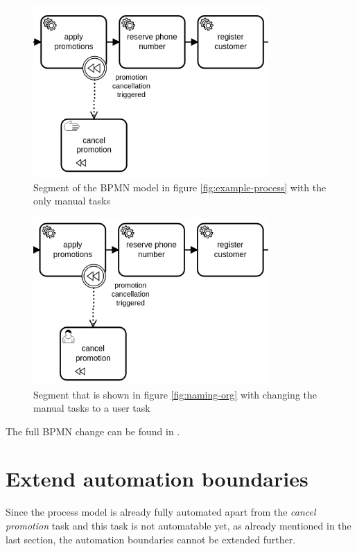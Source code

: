 \begin{minipage}[t]{0.5\textwidth}
	\begin{figure}[H]
		\centering
		\includegraphics[width=0.8\textwidth]{graphics/case-study-manual-org}
		\caption{Segment of the BPMN model in figure \ref{fig:example-process} with the only manual tasks}
		\label{fig:manual-org}
	\end{figure}
\end{minipage}
\begin{minipage}[t]{0.5\textwidth}
\begin{figure}[H]
	\centering
	\includegraphics[width=0.8\textwidth]{graphics/case-study-manual-new}
	\caption{Segment that is shown in figure \ref{fig:naming-org} with changing the manual tasks to a user task}
	\label{fig:manual-new}
\end{figure}
\end{minipage}

The full BPMN change can be found in \cite{online-BPMN-after-manual}.

\section{Extend automation boundaries}
Since the process model is already fully automated apart from the \textit{cancel promotion} task and this task is not automatable yet, as already mentioned in the last section, the automation boundaries cannot be extended further. 

